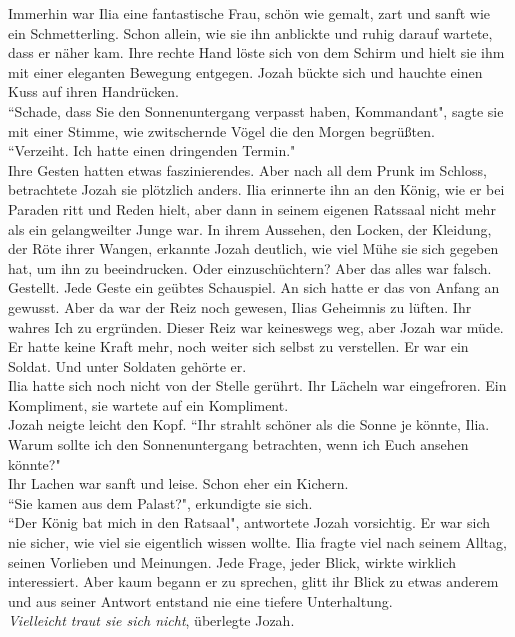 Immerhin war Ilia eine fantastische Frau, schön wie gemalt, zart und sanft wie ein Schmetterling. 
Schon allein, wie sie ihn anblickte und ruhig darauf wartete, dass er näher kam. Ihre rechte Hand 
löste sich von dem Schirm und hielt sie ihm mit einer eleganten Bewegung entgegen. Jozah bückte sich 
und hauchte einen Kuss auf ihren Handrücken.\\
 ``Schade, dass Sie den Sonnenuntergang verpasst haben, Kommandant", sagte sie mit einer Stimme, 
wie zwitschernde Vögel die den Morgen begrüßten.\\
 ``Verzeiht. Ich hatte einen dringenden Termin."\\
Ihre Gesten hatten etwas faszinierendes. Aber nach all dem Prunk im Schloss, betrachtete Jozah sie 
plötzlich anders. Ilia erinnerte ihn an den König, wie er bei Paraden ritt und Reden hielt, aber 
dann in seinem eigenen Ratssaal nicht mehr als ein gelangweilter Junge war. In ihrem Aussehen, den 
Locken, der Kleidung, der Röte ihrer Wangen, erkannte Jozah deutlich, wie viel Mühe sie sich 
gegeben hat, um ihn zu beeindrucken. Oder einzuschüchtern? Aber das alles war falsch. Gestellt. 
Jede Geste ein geübtes Schauspiel. An sich hatte er das von Anfang an gewusst. Aber da war der Reiz 
noch gewesen, Ilias Geheimnis zu lüften. Ihr wahres Ich zu ergründen. Dieser Reiz war keineswegs 
weg, aber Jozah war müde. Er hatte keine Kraft mehr, noch weiter sich selbst zu verstellen. Er war 
ein Soldat. Und unter Soldaten gehörte er. \\
Ilia hatte sich noch nicht von der Stelle gerührt. Ihr Lächeln war eingefroren. Ein Kompliment, sie 
wartete auf ein Kompliment.\\
Jozah neigte leicht den Kopf.  ``Ihr strahlt schöner als die Sonne je könnte, Ilia. Warum sollte 
ich den Sonnenuntergang betrachten, wenn ich Euch ansehen könnte?"\\
Ihr Lachen war sanft und leise. Schon eher ein Kichern. \\
 ``Sie kamen aus dem Palast?", erkundigte sie sich.\\
 ``Der König bat mich in den Ratsaal", antwortete Jozah vorsichtig. Er war sich nie sicher, wie 
viel sie eigentlich wissen wollte. Ilia fragte viel nach seinem Alltag, seinen Vorlieben und 
Meinungen. Jede Frage, jeder Blick, wirkte wirklich interessiert. Aber kaum begann er zu sprechen, 
glitt ihr Blick zu etwas anderem und aus seiner Antwort entstand nie eine tiefere Unterhaltung.\\
\textit{Vielleicht traut sie sich nicht}, überlegte Jozah. \\

